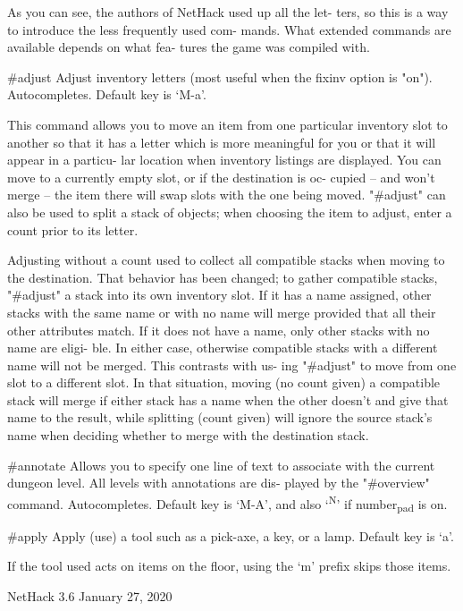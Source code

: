 \documentclass[11pt]{article}
\begin{document}
   As you can see, the authors of NetHack used up all the let-
ters, so this is a way to introduce the less frequently used com-
mands. What extended commands are available depends on what fea-
tures the game was compiled with.

\#adjust
   Adjust inventory letters (most useful when the fixinv option
   is "on"). Autocompletes. Default key is `M-a'.

This command allows you to move an item from one particular
inventory slot to another so that it has a letter which is
more meaningful for you or that it will appear in a particu-
lar location when inventory listings are displayed. You can
move to a currently empty slot, or if the destination is oc-
cupied -- and won't merge -- the item there will swap slots
with the one being moved. "\#adjust" can also be used to
split a stack of objects; when choosing the item to adjust,
enter a count prior to its letter.

Adjusting without a count used to collect all compatible
stacks when moving to the destination.  That behavior has
been changed; to gather compatible stacks, "\#adjust" a stack
into its own inventory slot. If it has a name assigned,
other stacks with the same name or with no name will merge
provided that all their other attributes match. If it does
not have a name, only other stacks with no name are eligi-
ble. In either case, otherwise compatible stacks with a
different name will not be merged. This contrasts with us-
ing "\#adjust" to move from one slot to a different slot. In
that situation, moving (no count given) a compatible stack
will merge if either stack has a name when the other doesn't
and give that name to the result, while splitting (count
given) will ignore the source stack's name when deciding
whether to merge with the destination stack.

\#annotate
   Allows you to specify one line of text to associate with the
   current dungeon level. All levels with annotations are dis-
   played by the "\#overview" command. Autocompletes. Default
   key is `M-A', and also `\textsuperscript{N}' if number\textsubscript{pad} is on.

\#apply
   Apply (use) a tool such as a pick-axe, a key, or a lamp.
   Default key is `a'.

If the tool used acts on items on the floor, using the `m'
prefix skips those items.



NetHack 3.6                   January 27, 2020
\end{document}

